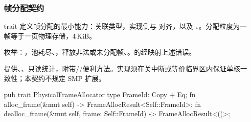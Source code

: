 
\subsubsection{帧分配契约}

 trait 定义帧分配的最小能力：关联类型，实现侧与  对齐，以及 、。分配粒度为一帧等于一页物理存储，4\,KiB。

枚举：，池耗尽、，释放非法或未分配帧、。的经映射上述错误。

提供、、只读统计，附带//便利方法。实现须在关中断或等价临界区内保证单核一致性；本契约不规定 SMP 扩展。

\begin{rustcode}
pub trait PhysicalFrameAllocator {
    type FrameId: Copy + Eq;
    fn alloc_frame(&mut self) -> FrameAllocResult<Self::FrameId>;
    fn dealloc_frame(&mut self, frame: Self::FrameId) -> FrameAllocResult<()>;
}
\end{rustcode}
